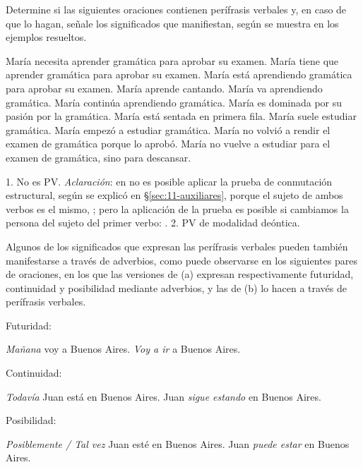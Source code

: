 \begin{ejercicio}\label{ej:11-significados}
Determine si las siguientes oraciones contienen perífrasis verbales y, en caso de
que lo hagan, señale los significados que manifiestan, según se muestra en los
ejemplos resueltos.

\begin{exe}
  \ex María necesita aprender gramática para aprobar su examen.
  \ex María tiene que aprender gramática para aprobar su examen.
  \ex María está aprendiendo gramática para aprobar su examen.
  \ex María aprende cantando.
  \ex María va aprendiendo gramática.
  \ex María continúa aprendiendo gramática.
  \ex María es dominada por su pasión por la gramática.
  \ex María está sentada en primera fila.
  \ex María suele estudiar gramática.
  \ex María empezó a estudiar gramática.
  \ex María no volvió a rendir el examen de gramática porque lo aprobó.
  \ex María no vuelve a estudiar para el examen de gramática, sino para
      descansar.
\end{exe}

\begin{resuelto}
1. No es PV. \textit{Aclaración}: en  no es posible
aplicar la prueba de conmutación estructural, según se explicó en
§\ref{sec:11-auxiliares}, porque el sujeto de ambos verbos es el mismo,
; pero la aplicación de la prueba es posible si cambiamos la persona
del sujeto del primer verbo: . 2.
PV de modalidad deóntica.
\end{resuelto}
\end{ejercicio}

\begin{recuadro}
Algunos de los significados que expresan las perífrasis verbales pueden también
manifestarse a través de adverbios, como puede observarse en los siguientes pares
de oraciones, en los que las versiones de (a) expresan respectivamente futuridad,
continuidad y posibilidad mediante adverbios, y las de (b) lo hacen a través de
perífrasis verbales.

\begin{exe}
  \ex Futuridad:
    \begin{xlist}
      \ex \textit{Mañana} voy a Buenos Aires.
      \ex \textit{Voy a ir} a Buenos Aires.
    \end{xlist}
  \ex Continuidad:
    \begin{xlist}
      \ex \textit{Todavía} Juan está en Buenos Aires.
      \ex Juan \textit{sigue estando} en Buenos Aires.
    \end{xlist}
  \ex Posibilidad:
    \begin{xlist}
      \ex \textit{Posiblemente / Tal vez} Juan esté en Buenos Aires.
      \ex Juan \textit{puede estar} en Buenos Aires.
    \end{xlist}
\end{exe}
\end{recuadro}

